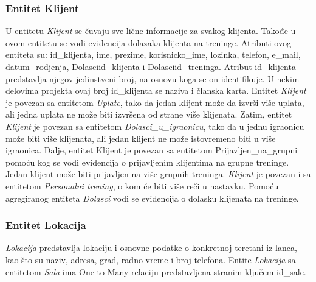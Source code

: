 \documentclass[../main.tex]{subfiles}
\begin{document}
\subsubsection{Entitet Klijent}
U entitetu \textit{Klijent} se čuvaju sve lične informacije za svakog klijenta. Takođe u ovom entitetu se vodi evidencija dolazaka klijenta na treninge. Atributi ovog entiteta su: id\_klijenta, ime, prezime, korisnicko\_ime, lozinka, telefon, e\_mail, datum\_rodjenja, Dolasciid\_klijenta i  Dolasciid\_treninga.
Atribut id\_klijenta predstavlja njegov jedinstveni broj, na osnovu koga se on identifikuje. U nekim delovima projekta ovaj broj id\_klijenta se naziva i članska karta. 
Entitet \textit{Klijent} je povezan sa entitetom \textit{Uplate}, tako da jedan klijent može da izvrši više uplata, ali jedna uplata ne može biti izvršena od strane više klijenata. Zatim, entitet \textit{Klijent} je povezan sa entitetom \textit{Dolasci\_u\_igraonicu}, tako da u jednu igraonicu može biti više klijenata, ali jedan klijent ne može istovremeno biti u više igraonica. %
Dalje, entitet Klijent je povezan sa entitetom Prijavljen\_na\_grupni pomoću kog se vodi evidencija o prijavljenim klijentima na grupne treninge. Jedan klijent može biti prijavljen na više grupnih treninga.
\textit{Klijent} je povezan i sa entitetom \textit{Personalni trening}, o kom će biti više reči u nastavku.
Pomoću agregiranog entiteta \textit{Dolasci} vodi se evidencija o dolasku klijenata na treninge.


\subsubsection{Entitet Lokacija}

\textit{Lokacija} predstavlja lokaciju i osnovne podatke o konkretnoj teretani iz lanca, kao što su naziv, adresa, grad, radno vreme i broj telefona.
Entite \textit{Lokacija} sa entitetom \textit{Sala} ima One to Many relaciju predstavljena stranim ključem id\_sale. 
\end{document}
